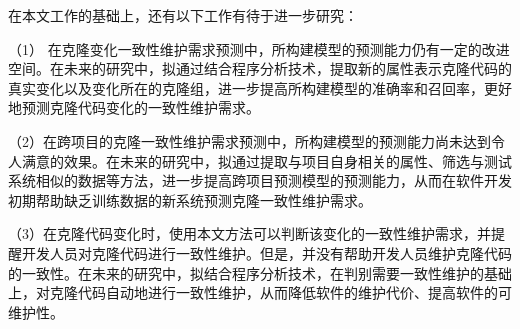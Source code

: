 在本文工作的基础上，还有以下工作有待于进一步研究：

（1） 在克隆变化一致性维护需求预测中，所构建模型的预测能力仍有一定的改进空间。在未来的研究中，拟通过结合程序分析技术，提取新的属性表示克隆代码的真实变化以及变化所在的克隆组，进一步提高所构建模型的准确率和召回率，更好地预测克隆代码变化的一致性维护需求。

（2）在跨项目的克隆一致性维护需求预测中，所构建模型的预测能力尚未达到令人满意的效果。在未来的研究中，拟通过提取与项目自身相关的属性、筛选与测试系统相似的数据等方法，进一步提高跨项目预测模型的预测能力，从而在软件开发初期帮助缺乏训练数据的新系统预测克隆一致性维护需求。

（3）在克隆代码变化时，使用本文方法可以判断该变化的一致性维护需求，并提醒开发人员对克隆代码进行一致性维护。但是，并没有帮助开发人员维护克隆代码的一致性。在未来的研究中，拟结合程序分析技术，在判别需要一致性维护的基础上，对克隆代码自动地进行一致性维护，从而降低软件的维护代价、提高软件的可维护性。%